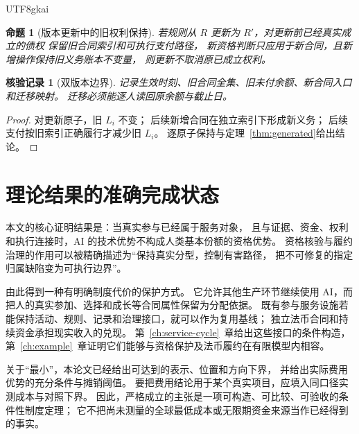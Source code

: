 \documentclass[12pt,a4paper,openany]{report}
\newtheorem{proposition}{命题}[chapter]
\newtheorem{Certificate}{核验记录}[chapter]
\begin{document}
\begin{CJK*}{UTF8}{gkai}
\begin{proposition}[版本更新中的旧权利保持]
若规则从 \(R\) 更新为 \(R'\)，对更新前已经真实成立的债权
保留旧合同索引和可执行支付路径，
新资格判断只应用于新合同，且新增操作保持旧义务账本不变量，
则更新不取消原已成立权利。
\end{proposition}
\begin{Certificate}[双版本边界]
记录生效时刻、旧合同全集、旧未付余额、新合同入口和迁移映射。
迁移必须能逐人读回原余额与截止日。
\end{Certificate}
\begin{proof}
对更新原子，旧 \(L_i\) 不变；
后续新增合同在独立索引下形成新义务；
后续支付按旧索引正确履行才减少旧 \(L_i\)。
逐原子保持与定理~\ref{thm:generated}给出结论。
\end{proof}

\section{理论结果的准确完成状态}
本文的核心证明结果是：当真实参与已经属于服务对象，
且与证据、资金、权利和执行连接时，AI 的技术优势不构成人类基本份额的资格优势。
资格核验与履约治理的作用可以被精确描述为“保持真实分型，控制有害路径，
把不可修复的指定归属缺陷变为可执行边界”。

由此得到一种有明确制度代价的保护方式。
它允许其他生产环节继续使用 AI，而把人的真实参加、选择和成长等合同属性保留为分配依据。
既有参与服务设施若能保持活动、规则、记录和治理接口，就可以作为复用基线；
独立法币合同和持续资金承担现实收入的兑现。
第~\ref{ch:service-cycle}~章给出这些接口的条件构造，
第~\ref{ch:example}~章证明它们能够与资格保护及法币履约在有限模型内相容。

关于“最小”，本论文已经给出可达到的表示、位置和方向下界，
并给出实际费用优势的充分条件与摊销阈值。
要把费用结论用于某个真实项目，应填入同口径实测成本与对照下界。
因此，严格成立的主张是一项可构造、可比较、可验收的条件性制度定理；
它不把尚未测量的全球最低成本或无限期资金来源当作已经得到的事实。

\appendix


\end{CJK*}
\end{document}
